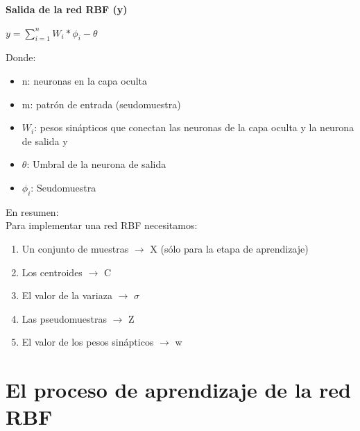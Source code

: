 \documentclass[
	11pt, %
]{beamer}
\begin{document}
\begin{frame}

  \textbf{Salida de la red RBF (y)}
  \bigskip %
  \begin{center}
    $y = \sum_{i=1} ^{n} W_{i} * \phi_{i} - \theta $
  \end{center}
  \bigskip %
  Donde:
  \begin{itemize}
  \item n: neuronas en la capa oculta
  \item m: patrón de entrada (seudomuestra)
  \item $W_{i}$: pesos sinápticos que conectan las neuronas de la capa oculta y la neurona de salida y
  \item $\theta$: Umbral de la neurona de salida
  \item $\phi_{i}$: Seudomuestra
  \end{itemize}
  
\end{frame}


\begin{frame}
  En resumen:\\
  Para implementar una red RBF necesitamos:
  \bigskip %
  \begin{enumerate}
  \item Un conjunto de muestras $\rightarrow$ X (sólo para la etapa de aprendizaje)
  \item Los centroides $\rightarrow$ C
  \item El valor de la variaza $\rightarrow$ $\sigma$
  \item Las pseudomuestras $\rightarrow$ Z
  \item El valor de los pesos sinápticos $\rightarrow$ w
  \end{enumerate}
\end{frame}

\section{El proceso de aprendizaje de la red RBF}
\end{document}
